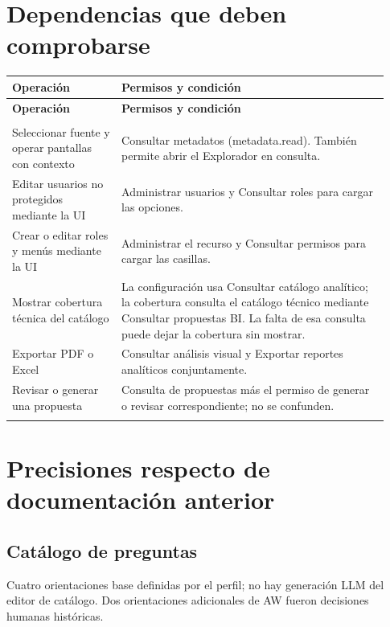 \section{Dependencias que deben comprobarse}
\begingroup
\fontsize{10}{12.5}\selectfont
\setlength{\tabcolsep}{5pt}
\renewcommand{\arraystretch}{1.15}
\begin{longtable}{@{}>{\RaggedRight\arraybackslash}p{0.27\linewidth}>{\RaggedRight\arraybackslash}p{0.66\linewidth}@{}}
\toprule
\textbf{Operación} & \textbf{Permisos y condición} \\
\midrule
\endfirsthead
\toprule
\textbf{Operación} & \textbf{Permisos y condición} \\
\midrule
\endhead
\midrule
\multicolumn{2}{r}{\footnotesize Continúa en la página siguiente}\\
\endfoot
\bottomrule
\endlastfoot
Seleccionar fuente y operar pantallas con contexto & Consultar metadatos (metadata.read). También permite abrir el Explorador en consulta. \\
\addlinespace[3pt]
Editar usuarios no protegidos mediante la UI & Administrar usuarios y Consultar roles para cargar las opciones. \\
\addlinespace[3pt]
Crear o editar roles y menús mediante la UI & Administrar el recurso y Consultar permisos para cargar las casillas. \\
\addlinespace[3pt]
Mostrar cobertura técnica del catálogo & La configuración usa Consultar catálogo analítico; la cobertura consulta el catálogo técnico mediante Consultar propuestas BI. La falta de esa consulta puede dejar la cobertura sin mostrar. \\
\addlinespace[3pt]
Exportar PDF o Excel & Consultar análisis visual y Exportar reportes analíticos conjuntamente. \\
\addlinespace[3pt]
Revisar o generar una propuesta & Consulta de propuestas más el permiso de generar o revisar correspondiente; no se confunden. \\
\addlinespace[3pt]
\end{longtable}
\endgroup

\section{Precisiones respecto de documentación anterior}
\subsection{Catálogo de preguntas}
Cuatro orientaciones base definidas por el perfil; no hay generación LLM del editor de catálogo. Dos orientaciones adicionales de AW fueron decisiones humanas históricas.

